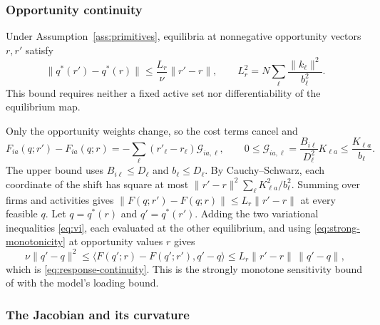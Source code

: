 \subsubsection{Opportunity continuity}

Under Assumption~\ref{ass:primitives}, equilibria at nonnegative opportunity
vectors $r,r'$ satisfy
\begin{equation}\label{eq:response-continuity}
  \|q^*(r')-q^*(r)\|\leq\frac{L_r}{\nu}\|r'-r\|,
  \qquad L_r^2=N\sum_\ell\frac{\|k_\ell\|^2}{b_\ell^2}.
\end{equation}
This bound requires neither a fixed active set nor differentiability of the
equilibrium map.

Only the opportunity weights change, so the cost terms cancel and
\begin{equation}\label{eq:app-field-shift}
  F_{ia}(q;r')-F_{ia}(q;r)=-\sum_\ell(r'_\ell-r_\ell)\mathcal G_{ia,\ell},
  \qquad
  0\leq\mathcal G_{ia,\ell}=\frac{B_{i\ell}}{D_\ell^2}K_{\ell
  a}\leq\frac{K_{\ell a}}{b_\ell}.
\end{equation}
The upper bound uses $B_{i\ell}\leq D_\ell$ and $b_\ell\leq D_\ell$.
By Cauchy--Schwarz, each coordinate of the shift has square at most
$\|r'-r\|^2\sum_\ell K_{\ell a}^2/b_\ell^2$.
Summing over firms and activities gives
$\|F(q;r')-F(q;r)\|\leq L_r\|r'-r\|$ at every feasible $q$.
Let $q=q^*(r)$ and $q'=q^*(r')$.
Adding the two variational inequalities \eqref{eq:vi}, each evaluated
at the other
equilibrium, and using \eqref{eq:strong-monotonicity} at opportunity
values $r$ gives
\begin{equation}\label{eq:app-continuity}
  \nu\|q'-q\|^2\leq\langle F(q';r)-F(q';r'),q'-q\rangle
  \leq L_r\|r'-r\|\,\|q'-q\|,
\end{equation}
which is \eqref{eq:response-continuity}.
This is the strongly monotone sensitivity bound of
\citet{parise_ozdaglar_network_games_2019} with the model's loading bound.

\subsubsection{The Jacobian and its curvature}\label{app:response-jacobian}

